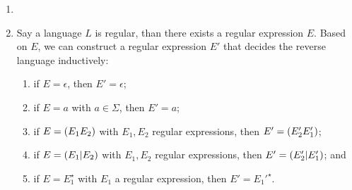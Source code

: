 \documentclass{article}
\begin{document}
\begin{exercise}
\begin{answer}
\begin{enumerate}
 \item 
 \item Say a language $L$ is regular, than there exists a regular expression $E$. Based on $E$, we can construct a regular expression $E'$ that decides the reverse language inductively:
 \begin{enumerate}
  \item if $E=\epsilon$, then $E'=\epsilon$;
  \item if $E=a$ with $a\in\Sigma$, then $E'=a$;
  \item if $E=\left( E_1E_2 \right)$ with $E_1,E_2$ regular expressions, then $E'=\left( E_2'E_1' \right)$;
  \item if $E=\left( E_1|E_2 \right)$ with $E_1,E_2$ regular expressions, then $E'=\left( E_2'|E_1' \right)$; and
  \item if $E=E_1^{\star}$ with $E_1$ a regular expression, then $E'=E_1'^{\star}$.
 \end{enumerate}
\end{enumerate}

\end{answer}
\end{exercise}
\end{document}
